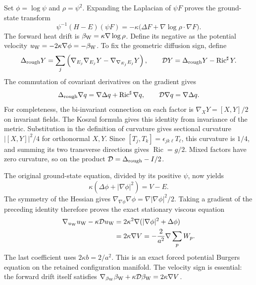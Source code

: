 Set $\phi=\log\psi$ and $\rho=\psi^2$. Expanding the Laplacian of
$\psi F$ proves the ground-state transform
\[
 \psi^{-1}(H-E)(\psi F)
  =-\kappa\bigl(\Delta F+\nabla\log\rho\cdot\nabla F\bigr).
\]
The forward heat drift is $\beta_{\rm W}=\kappa\nabla\log\rho$.
Define its negative as the potential velocity
$u_{\rm W}=-2\kappa\nabla\phi=-\beta_{\rm W}$.
To fix the geometric diffusion sign, define
\[
 \Delta_{\rm rough}Y=\sum_j\left(
 \nabla_{E_j}\nabla_{E_j}Y-
 \nabla_{\nabla_{E_j}E_j}Y\right),\qquad
 \mathcal D Y=\Delta_{\rm rough}Y-\operatorname{Ric}^{\sharp}Y.
\]
The commutation of covariant derivatives on the gradient gives
\[
 \Delta_{\rm rough}\nabla q
   =\nabla\Delta q+\operatorname{Ric}^{\sharp}\nabla q,
 \qquad \mathcal D\nabla q=\nabla\Delta q.
\]
For completeness, the bi-invariant connection on each factor is
$\nabla_XY=[X,Y]/2$ on invariant fields. The Koszul formula gives this
identity from invariance of the metric. Substitution in the definition
of curvature gives sectional curvature $|[X,Y]|^2/4$ for orthonormal
$X,Y$. Since $[T_j,T_k]=\epsilon_{jk\ell}T_\ell$, this curvature is
$1/4$, and summing its two transverse directions gives
$\operatorname{Ric}=g/2$. Mixed factors have zero curvature, so on the
product $\mathcal D=\Delta_{\rm rough}-I/2$.

The original ground-state equation, divided by its positive $\psi$,
now yields
\[
 \kappa(\Delta\phi+|\nabla\phi|^2)=V-E.
\]
The symmetry of the Hessian gives
$\nabla_{\nabla\phi}\nabla\phi=\nabla|\nabla\phi|^2/2$.
Taking a gradient of the preceding identity therefore proves the exact
stationary viscous equation
\begin{align}
 \nabla_{u_{\rm W}}u_{\rm W}-\kappa\mathcal D u_{\rm W}
 &=2\kappa^2\nabla(|\nabla\phi|^2+\Delta\phi)\notag\\
 &=2\kappa\nabla V
 =-\frac{2}{a^2}\nabla\sum_pW_p.
 \label{eq:s6dyn-wilson-burgers}
\end{align}
The last coefficient uses $2\kappa b=2/a^2$. This is an exact forced
potential Burgers equation on the retained configuration manifold.
The velocity sign is essential: the forward drift itself satisfies
$\nabla_{\beta_{\rm W}}\beta_{\rm W}+\kappa\mathcal D\beta_{\rm W}
=2\kappa\nabla V$.

